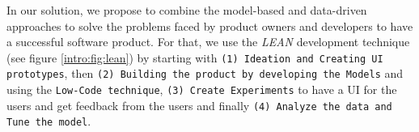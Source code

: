 \par
In our solution, we propose to combine the model-based and data-driven approaches to solve the problems faced by product owners and developers to have a successful software product.
For that, we use the \emph{LEAN} development technique (see figure \ref{intro:fig:lean}) by starting with \texttt{(1) Ideation and Creating UI prototypes}, then \texttt{(2) Building the product by developing the Models} and using the \texttt{Low-Code technique}, \texttt{(3) Create Experiments} to have a UI for the users and get feedback from the users and finally \texttt{(4) Analyze the data and Tune the model}.